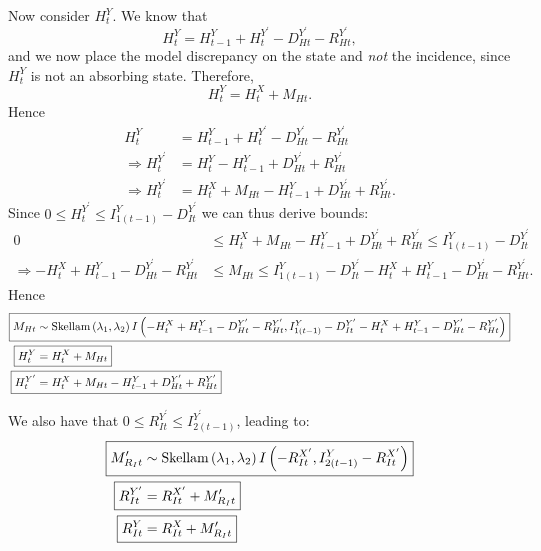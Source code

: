 \documentclass[a4paper]{article}
\begin{document}
Now consider $H^Y_t$. We know that
\begin{equation*}
    H^Y_t = H^Y_{t - 1} + H^{Y^\prime}_t - D^{Y^\prime}_{Ht} - R^{Y^\prime}_{Ht},
\end{equation*}
and we now place the model discrepancy on the state and \textit{not} the incidence, since $H^Y_t$ is not an absorbing state. Therefore, 
\begin{equation*}
    H^Y_t = H^X_t + M_{Ht}.
\end{equation*}
Hence
\begin{align*}
    H^Y_t &= H^Y_{t - 1} + H^{Y^\prime}_t - D^{Y^\prime}_{Ht} - R^{Y^\prime}_{Ht}\\
    \Rightarrow H^{Y^\prime}_t &= H^Y_t - H^Y_{t - 1} + D^{Y^\prime}_{Ht} + R^{Y^\prime}_{Ht}\\
    \Rightarrow H^{Y^\prime}_t &= H^X_t + M_{Ht} - H^Y_{t - 1} + D^{Y^\prime}_{Ht} + R^{Y^\prime}_{Ht}.
\end{align*}
Since $0 \leq H^{Y^\prime}_t \leq I^Y_{1(t - 1)} - D^{Y^\prime}_{It}$ we can thus derive bounds:
\begin{align*}
    0 &\leq H^X_t + M_{Ht} - H^Y_{t - 1} + D^{Y^\prime}_{Ht} + R^{Y^\prime}_{Ht} \leq I^Y_{1(t - 1)} - D^{Y^\prime}_{It}\\
    \Rightarrow -H^X_t + H^Y_{t - 1} - D^{Y^\prime}_{Ht} - R^{Y^\prime}_{Ht} &\leq M_{Ht} \leq I^Y_{1(t - 1)}  - D^{Y^\prime}_{It} - H^X_t + H^Y_{t - 1} - D^{Y^\prime}_{Ht} - R^{Y^\prime}_{Ht}.
\end{align*}
Hence
\begin{align*}
\Aboxed{M_{Ht} &\sim \mbox{Skellam}\left(\lambda_1, \lambda_2\right)I\left(-H^X_t + H^Y_{t - 1} - D^{Y^\prime}_{Ht} - R^{Y^\prime}_{Ht}, I^Y_{1(t - 1)} - D^{Y^\prime}_{It} - H^X_t + H^Y_{t - 1} - D^{Y^\prime}_{Ht} - R^{Y^\prime}_{Ht}\right)}\\
    \Aboxed{H^Y_{t} &= H^X_{t} + M_{Ht}}\\
    \Aboxed{H^{Y^\prime}_{t} &= H^X_t + M_{Ht} - H^Y_{t - 1} + D^{Y^\prime}_{Ht} + R^{Y^\prime}_{Ht}}
\end{align*}

We also have that $0 \leq R^{Y^\prime}_{It} \leq I^{Y^\prime}_{2(t - 1)}$, leading to:
\begin{align*}
\Aboxed{M^\prime_{R_It} &\sim \mbox{Skellam}\left(\lambda_1, \lambda_2\right)I\left(-R^{X^\prime}_{It}, I^Y_{2(t - 1)} - R^{X^\prime}_{It}\right)}\\
    \Aboxed{R^{Y^\prime}_{It} &= R^{X^\prime}_{It} + M^\prime_{R_It}}\\
    \Aboxed{R^Y_{It} &= R^X_{It} + M^\prime_{R_It}}
\end{align*}
\end{document}
